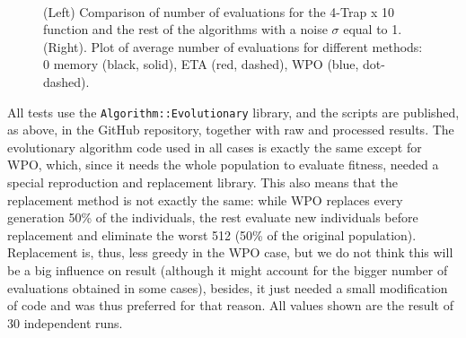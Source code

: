 \documentclass{llncs}
\begin{document}
\begin{figure}[!t] %
\centering
{}
~
\caption{(Left) Comparison of number of evaluations for the 4-Trap x
  10 function and the rest of the algorithms with a noise $\sigma$
  equal to 1. (Right). Plot of average number of evaluations for
  different methods: 0 memory (black, solid), ETA (red, dashed), WPO
  (blue, dot-dashed). \label{fig:trap:evals}}
\end{figure}
%
All tests use the {\tt Algorithm::Evolutionary} library, and the scripts
are published, as above, in the GitHub repository, together with raw
and processed results. The evolutionary algorithm code used in all
cases is exactly the same except for WPO, which, since it needs the
whole population to evaluate fitness, needed a special reproduction
and replacement library. This also means that the replacement method
is not exactly the same: while WPO replaces every generation 50\% of
the individuals, the rest evaluate new individuals before replacement
and eliminate the worst 512 (50\% of the original
population). 
Replacement is, thus, less greedy in the WPO case, but
we do not think this will be a big influence on result 
(although it might account for the bigger number of evaluations obtained in some
cases), besides, it just needed a small modification of code and was
thus preferred for that reason. All values shown are the result of 30
independent runs.
\end{document}

